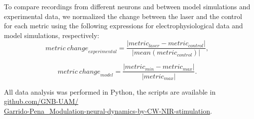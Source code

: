 To compare recordings from different neurons and between model simulations and experimental data, we normalized the change between the laser and the control for each metric using the following expressions for electrophysiological data and model simulations, respectively:
\begin{equation}
    {metric\ change}_{experimental} = \frac{|metric_{laser} - metric_{control}|}{|mean(metric_{control})|},
\end{equation}

\begin{equation}
    {metric\ change}_{model} = \frac{|metric_{min} - metric_{max}|}{|metric_{max}|}.
\end{equation}

All data analysis was performed in Python, the scripts are available in \href{https://github.com/GNB-UAM/Garrido-Pena_Modulation-neural-dynamics-by-CW-NIR-stimulation}{github.com/GNB-UAM/\\Garrido-Pena\_Modulation-neural-dynamics-by-CW-NIR-stimulation}.

